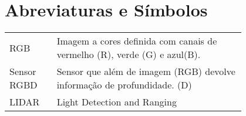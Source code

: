 \chapter*{Abreviaturas e Símbolos}

\begin{flushleft}
\begin{tabular}{l p{0.8\linewidth}}
	RGB & Imagem a cores definida com canais de vermelho (R), verde (G) e azul(B).\\
	Sensor RGBD & Sensor que além de imagem (RGB) devolve informação de profundidade. (D)\\
	LIDAR & Light Detection and Ranging \\


\end{tabular}
\end{flushleft}


